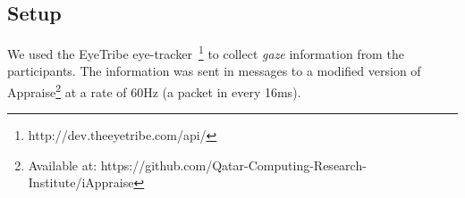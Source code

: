 \subsection{\Eye Setup}



We used the EyeTribe eye-tracker~\footnote{http://dev.theeyetribe.com/api/} to collect \emph{gaze} information from the participants. The information was sent in messages to a modified version of Appraise\footnote{Available at: https://github.com/Qatar-Computing-Research-Institute/iAppraise} at a rate of 60Hz (a packet in every 16ms). 
%

